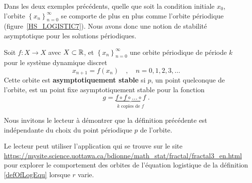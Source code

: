 {%


Dans les deux exemples précédents, quelle que soit la condition
initiale $x_0$, l'orbite
$\displaystyle \left\{ x_n\right\}_{n=0}^\infty$ se comporte de plus
en plus comme l'orbite périodique (figure~\ref{HS_LOGISTIC7}).  Nous
avons donc une notion de stabilité asymptotique pour les solutions
périodiques.


\begin{defn}
Soit $f: X \to X$ avec $X \subset \mathbb{R}$, et
$\displaystyle \left\{ x_n \right\}_{n=0}^\infty$ une orbite périodique
de période $k$ pour le système dynamique discret
\[
x_{n+1} = f(x_n) \quad , \quad n=0, 1, 2, 3, \ldots
\]
Cette orbite est {\bfseries asymptotiquement stable} si $p$, un point
quelconque de l'orbite, est un point fixe asymptotiquement stable pour
la fonction
\[
 g = \underbrace{f\circ f \circ \ldots \circ f}_{\text{$k$ copies de $f$}} \; .
\]
\end{defn}

\begin{rmk}
Nous invitons le lecteur à démontrer que la définition précédente est
indépendante du choix du point périodique $p$ de l'orbite.
\end{rmk}

Le lecteur peut utiliser l'application qui se trouve sur le site\\
\href{https://mysite.science.uottawa.ca/bdionne/math_stat/fractal/fractal3_en.html}{https://mysite.science.uottawa.ca/bdionne/math\_stat/fractal/fractal3\_en.html} pour explorer le comportement des
orbites de l'équation logistique de la définition \ref{defOfLogEqu}
lorsque $r$ varie.

}  %


